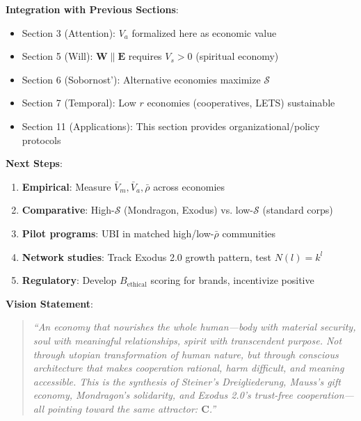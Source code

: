\documentclass[11pt,a4paper]{article}
\theoremstyle{definition}
\theoremstyle{remark}
\newcommand{\EE}{\mathbf{E}}
\newcommand{\WW}{\mathbf{W}}
\begin{document}
\begin{enumerate}
\begin{mdframed}[backgroundcolor=green!10,linewidth=2pt,linecolor=green!70!black]
\textbf{Integration with Previous Sections}:
\begin{itemize}[nosep]
    \item Section 3 (Attention): \(V_a\) formalized here as economic value
    \item Section 5 (Will): \(\WW \parallel \EE\) requires \(V_s > 0\) (spiritual economy)
    \item Section 6 (Sobornost'): Alternative economies maximize \(\mathcal{S}\)
    \item Section 7 (Temporal): Low \(r\) economies (cooperatives, LETS) sustainable
    \item Section 11 (Applications): This section provides organizational/policy protocols
\end{itemize}

\textbf{Next Steps}:
\begin{enumerate}[nosep]
    \item \textbf{Empirical}: Measure \(\bar{V}_m, \bar{V}_a, \bar{\rho}\) across economies
    \item \textbf{Comparative}: High-\(\mathcal{S}\) (Mondragon, Exodus) vs. low-\(\mathcal{S}\) (standard corps)
    \item \textbf{Pilot programs}: UBI in matched high/low-\(\bar{\rho}\) communities
    \item \textbf{Network studies}: Track Exodus 2.0 growth pattern, test \(N(l) = k^l\)
    \item \textbf{Regulatory}: Develop \(B_{\text{ethical}}\) scoring for brands, incentivize positive
\end{enumerate}

\textbf{Vision Statement}:
\begin{quote}
\textit{``An economy that nourishes the whole human—body with material security, soul with meaningful relationships, spirit with transcendent purpose. Not through utopian transformation of human nature, but through conscious architecture that makes cooperation rational, harm difficult, and meaning accessible. This is the synthesis of Steiner's Dreigliederung, Mauss's gift economy, Mondragon's solidarity, and Exodus 2.0's trust-free cooperation—all pointing toward the same attractor: \(\mathbf{C}\).''}
\end{quote}
\end{mdframed}

\vspace{2em}

\begin{figure}[H]
\centering
{}
\end{figure}
\end{enumerate}
\end{document}
